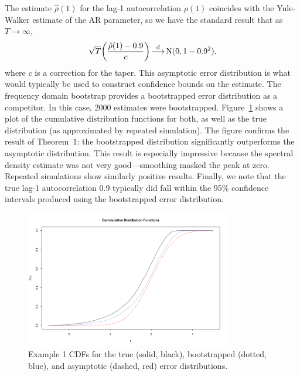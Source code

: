 The estimate $\hat{\rho}(1)$ for the lag-1 autocorrelation $\rho(1)$
coincides with the Yule-Walker estimate of the AR parameter,
so we have the standard result that as $T \to \infty$,
    \[
        \sqrt{T} \biggl( \frac{\hat{\rho}(1) - 0.9}{c} \biggr)
        \mathop{\overset{\mathrm{d}}{\longrightarrow}}
        \operatorname{N}(0, 1 - 0.9^2),
    \]
where $c$ is a correction for the taper.
This asymptotic error distribution is what would typically be used to construct
confidence bounds on the estimate.
The frequency domain bootstrap provides a bootstrapped error distribution as
a competitor. 
In this case, $2000$ estimates were bootstrapped.
Figure~\ref{ex1_cdf} shows a plot of the cumulative distribution functions for
both, as well as the true distribution (as approximated by repeated 
simulation).
The figure confirms the result of Theorem~1:
the bootstrapped distribution significantly outperforms the asymptotic
distribution.
This result is especially impressive because the spectral density estimate
was not very good---smoothing masked the peak at zero.
Repeated simulations show similarly positive results.
Finally, we note that the true lag-1 autocorrelation 0.9 typically did fall
within the 95\% confidence intervals produced using the bootstrapped error
distribution.
    \begin{figure}[ht]
    \centering
    \includegraphics[width = 0.8\textwidth]{../res/ex1_cdf.png}
    \caption{
        Example 1
        CDFs for the true (solid, black), bootstrapped (dotted, blue),
        and asymptotic (dashed, red) error distributions.
        }
    \label{ex1_cdf}
    \end{figure}

